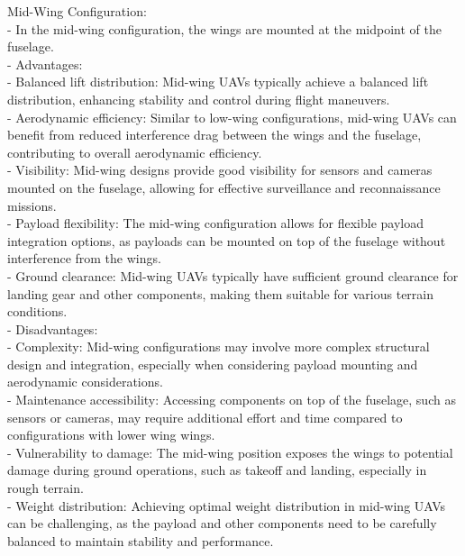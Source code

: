 \documentclass[12 pt]{article}
\begin{document}
\color{red}
Mid-Wing Configuration:
\color{black}
\\- In the mid-wing configuration, the wings are mounted at the midpoint of the fuselage.
\color{red}
\\- Advantages:
\color{black}
\\  - Balanced lift distribution: Mid-wing UAVs typically achieve a balanced lift distribution, enhancing stability and control during flight maneuvers.
 \\ - Aerodynamic efficiency: Similar to low-wing configurations, mid-wing UAVs can benefit from reduced interference drag between the wings and the fuselage, contributing to overall aerodynamic efficiency.
\\  - Visibility: Mid-wing designs provide good visibility for sensors and cameras mounted on the fuselage, allowing for effective surveillance and reconnaissance missions.
\\  - Payload flexibility: The mid-wing configuration allows for flexible payload integration options, as payloads can be mounted on top of the fuselage without interference from the wings.
 \\ - Ground clearance: Mid-wing UAVs typically have sufficient ground clearance for landing gear and other components, making them suitable for various terrain conditions.
\color{red}
\\- Disadvantages:
\color{black}
\\  - Complexity: Mid-wing configurations may involve more complex structural design and integration, especially when considering payload mounting and aerodynamic considerations.
\\  - Maintenance accessibility: Accessing components on top of the fuselage, such as sensors or cameras, may require additional effort and time compared to configurations with lower wing wings.
\\  - Vulnerability to damage: The mid-wing position exposes the wings to potential damage during ground operations, such as takeoff and landing, especially in rough terrain.
 \\ - Weight distribution: Achieving optimal weight distribution in mid-wing UAVs can be challenging, as the payload and other components need to be carefully balanced to maintain stability and performance.
\end{document}

